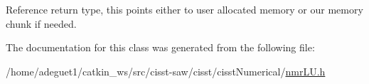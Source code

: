 Reference return type, this points either to user allocated memory or our memory chunk if needed. 

The documentation for this class was generated from the following file\-:\begin{DoxyCompactItemize}
\item 
/home/adeguet1/catkin\-\_\-ws/src/cisst-\/saw/cisst/cisst\-Numerical/\hyperlink{nmr_l_u_8h}{nmr\-L\-U.\-h}\end{DoxyCompactItemize}
